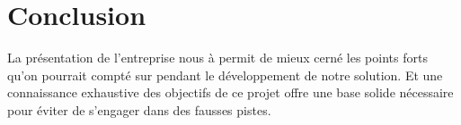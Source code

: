 \section{Conclusion} 

La présentation de l'entreprise nous à permit de mieux cerné les points forts
qu'on pourrait compté sur pendant le développement de notre solution. Et une
connaissance exhaustive des objectifs de ce projet offre une base solide
nécessaire pour éviter de s’engager dans des fausses pistes.
